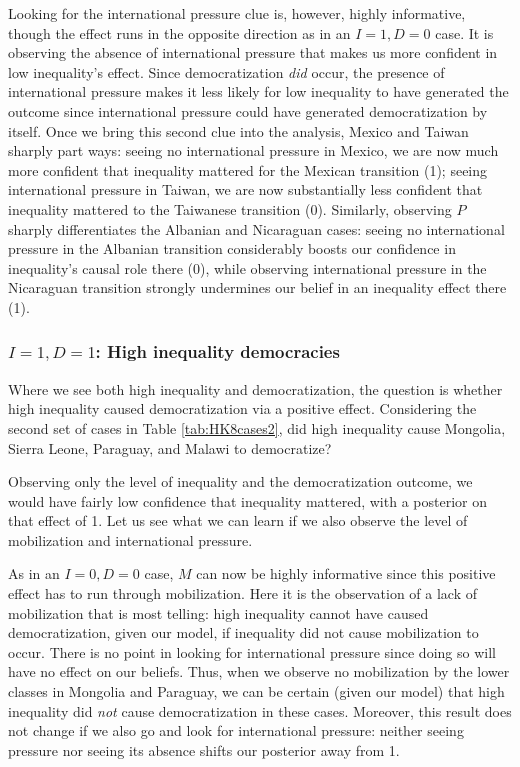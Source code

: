 \documentclass[12pt,]{book}
\begin{document}
Looking for the international pressure clue is, however, highly informative, though the effect runs in the opposite direction as in an \(I=1, D=0\) case. It is observing the absence of international pressure that makes us more confident in low inequality's effect. Since democratization \emph{did} occur, the presence of international pressure makes it less likely for low inequality to have generated the outcome since international pressure could have generated democratization by itself. Once we bring this second clue into the analysis, Mexico and Taiwan sharply part ways: seeing no international pressure in Mexico, we are now much more confident that inequality mattered for the Mexican transition (1); seeing international pressure in Taiwan, we are now substantially less confident that inequality mattered to the Taiwanese transition (0). Similarly, observing \(P\) sharply differentiates the Albanian and Nicaraguan cases: seeing no international pressure in the Albanian transition considerably boosts our confidence in inequality's causal role there (0), while observing international pressure in the Nicaraguan transition strongly undermines our belief in an inequality effect there (1).

\hypertarget{i1-d1-high-inequality-democracies}{%
\subsubsection{\texorpdfstring{\(I=1, D=1\): High inequality democracies}{I=1, D=1: High inequality democracies}}\label{i1-d1-high-inequality-democracies}}

Where we see both high inequality and democratization, the question is whether high inequality caused democratization via a positive effect. Considering the second set of cases in Table \ref{tab:HK8cases2}, did high inequality cause Mongolia, Sierra Leone, Paraguay, and Malawi to democratize?

Observing only the level of inequality and the democratization outcome, we would have fairly low confidence that inequality mattered, with a posterior on that effect of 1. Let us see what we can learn if we also observe the level of mobilization and international pressure.

As in an \(I=0, D=0\) case, \(M\) can now be highly informative since this positive effect has to run through mobilization. Here it is the observation of a lack of mobilization that is most telling: high inequality cannot have caused democratization, given our model, if inequality did not cause mobilization to occur. There is no point in looking for international pressure since doing so will have no effect on our beliefs. Thus, when we observe no mobilization by the lower classes in Mongolia and Paraguay, we can be certain (given our model) that high inequality did \emph{not} cause democratization in these cases. Moreover, this result does not change if we also go and look for international pressure: neither seeing pressure nor seeing its absence shifts our posterior away from 1.
\end{document}
